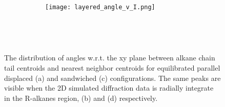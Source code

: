 \documentclass{article}
\begin{document}
\begin{figure}[ht]
\begin{subfigure}{\linewidth}
\begin{subfigure}{0.45\textwidth}
	\caption{}~\label{fig:rz_layered}
\end{subfigure}
\begin{subfigure}{0.45\textwidth}
	\centering
	\texttt{[image: layered\_angle\_v\_I.png]}
	\caption{}~\label{fig:test}
\end{subfigure}
\end{subfigure}
\caption{The distribution of angles w.r.t. the xy plane between alkane chain tail centroids and nearest 
neighbor centroids for equilibrated parallel displaced (a) and sandwiched (c) configurations. The 
same peaks are visible when the 2D simulated diffraction data is radially integrate in the R-alkanes region,
(b) and (d) respectively.}~\label{fig:tail_packing}
\end{figure}
\end{document}

